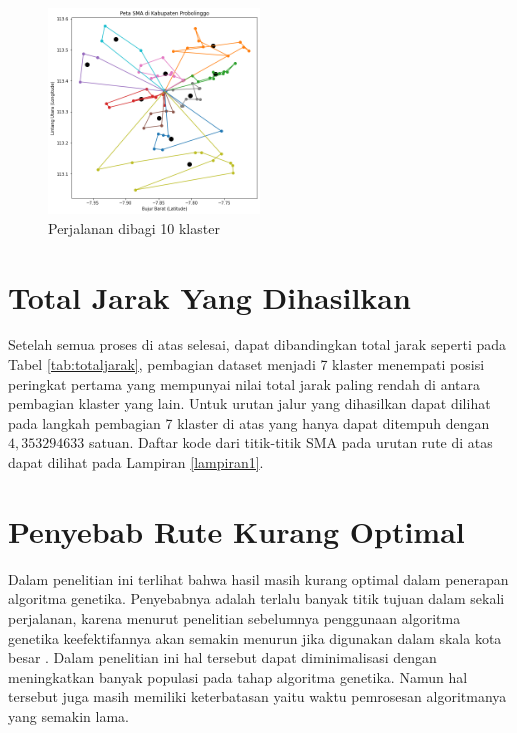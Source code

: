 \begin{figure}[H]
\centering
\includegraphics[width=0.5\textwidth]{Gambar/hasil_mtsp/10}
\caption{Perjalanan dibagi 10 klaster}
\label{fig:hasil_mtsp10}
\end{figure}

\section{Total Jarak Yang Dihasilkan}
Setelah semua proses di atas selesai, dapat dibandingkan total jarak seperti pada Tabel \ref{tab:totaljarak}, pembagian dataset  menjadi 7 klaster menempati posisi peringkat pertama yang mempunyai nilai total jarak paling rendah di antara pembagian klaster yang lain. Untuk urutan jalur yang dihasilkan dapat dilihat pada langkah pembagian 7 klaster di atas yang hanya dapat ditempuh dengan $4,353294633$ satuan. Daftar kode dari titik-titik SMA pada urutan rute di atas dapat dilihat pada Lampiran \ref{lampiran1}.



\section{Penyebab Rute Kurang Optimal}

Dalam penelitian ini terlihat bahwa hasil masih kurang optimal dalam penerapan algoritma genetika. Penyebabnya adalah terlalu banyak titik tujuan dalam sekali perjalanan, karena menurut penelitian sebelumnya penggunaan algoritma genetika keefektifannya akan semakin menurun jika digunakan dalam skala kota besar \cite{inproceedings}. Dalam penelitian ini hal tersebut dapat diminimalisasi dengan meningkatkan banyak populasi pada tahap algoritma genetika. Namun hal tersebut juga masih memiliki keterbatasan yaitu waktu pemrosesan algoritmanya yang semakin lama.